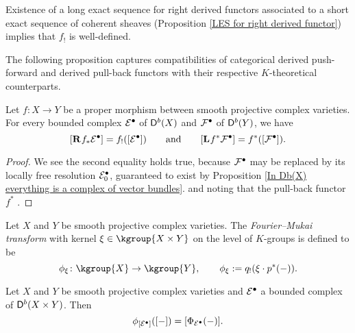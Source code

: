 \begin{remark}
    Existence of a long exact sequence for right derived functors associated to a short exact sequence of coherent sheaves (Proposition \ref{LES for right derived functor}) implies that $f_!$ is well-defined.
\end{remark}

The following proposition captures compatibilities of categorical derived push-forward and derived pull-back functors with their respective $K$-theoretical counterparts.  

\begin{proposition}
    \label{push-forward and pull-back compatibilities}
    Let $f \colon X \to Y$ be a proper morphism between smooth projective complex varieties. For every bounded complex $\mathcal E^\bullet$ of $\mathsf{D}^b(X)$ and $\mathcal F^\bullet$ of $\mathsf{D}^b(Y)$, we have
    \[
        [\mathbf{R}^{}f_*\mathcal E^\bullet] = f_!([\mathcal E^\bullet]) \qquad \text{and} \qquad [\mathbf{L}^{}f^*\mathcal F^\bullet] = f^*([\mathcal F^\bullet]).
    \]
\end{proposition}

\begin{proof}
    
    We see the second equality holds true, because $\mathcal F^\bullet$ may be replaced by its locally free resolution $\mathcal E_0^\bullet$, guaranteed to exist by Proposition \ref{In Db(X) everything is a complex of vector bundles}. and noting that the pull-back functor $f^*$ . 
\end{proof}


\begin{definition}
    Let $X$ and $Y$ be smooth projective complex varieties. The \emph{Fourier--Mukai transform} with kernel $\xi \in \kgroup{X \times Y}$ on the level of $K$-groups is defined to be
    \[
        \fmkt{\xi} \colon \kgroup{X} \to \kgroup{Y}, \qquad \fmkt{\xi} := q_!(\xi \cdot p^*(-)).
    \]
\end{definition}

\begin{corollary}
    Let $X$ and $Y$ be smooth projective complex varieties and $\mathcal E^\bullet$ a bounded complex of $\mathsf{D}^b(X \times Y)$. Then
    \[
        \phi_{[\mathcal E^\bullet]}([-]) = [\Phi_{\mathcal E^\bullet}(-)].
    \]
\end{corollary}

